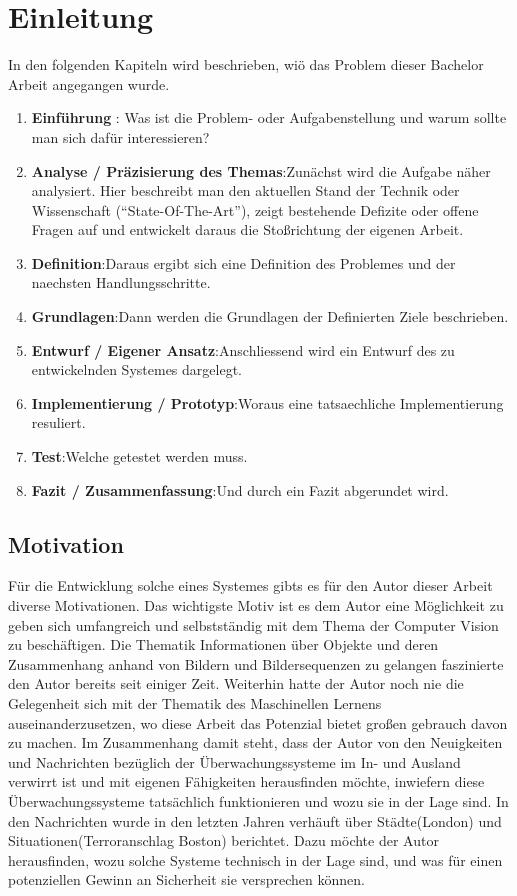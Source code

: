 \chapter{Einleitung}
In den folgenden Kapiteln wird beschrieben, wiö das Problem dieser Bachelor Arbeit angegangen wurde.

\begin{enumerate}
\item \textbf{Einführung }: Was ist die Problem- oder Aufgabenstellung und warum sollte man sich dafür interessieren?
\item \textbf{Analyse / Präzisierung des Themas}:Zunächst wird die Aufgabe näher analysiert. Hier beschreibt man den aktuellen Stand der Technik oder Wissenschaft ("`State-Of-The-Art"'), zeigt bestehende
							Defizite oder offene Fragen auf und entwickelt daraus die Sto\ss{}richtung der eigenen Arbeit.
\item \textbf{Definition}:Daraus ergibt sich eine Definition des Problemes und der naechsten Handlungsschritte.
\item \textbf{Grundlagen}:Dann werden die Grundlagen der Definierten Ziele beschrieben.
\item \textbf{Entwurf / Eigener Ansatz}:Anschliessend wird ein Entwurf des zu entwickelnden Systemes dargelegt.
\item \textbf{Implementierung / Prototyp}:Woraus eine tatsaechliche Implementierung resuliert.
\item \textbf{Test}:Welche getestet werden muss.
\item \textbf{Fazit / Zusammenfassung}:Und durch ein Fazit abgerundet wird.
\end{enumerate}

\section{Motivation}
Für die Entwicklung solche eines Systemes gibts es für den Autor dieser Arbeit diverse Motivationen. Das wichtigste Motiv ist es dem Autor eine Möglichkeit zu geben sich umfangreich und selbstständig mit dem Thema der Computer Vision zu beschäftigen. Die Thematik Informationen über Objekte und deren Zusammenhang anhand von Bildern und Bildersequenzen zu gelangen faszinierte den Autor bereits seit einiger Zeit. Weiterhin hatte der Autor noch nie die Gelegenheit sich mit der Thematik des Maschinellen Lernens auseinanderzusetzen, wo diese Arbeit das Potenzial bietet gro\ss{}en gebrauch davon zu machen.
Im Zusammenhang damit steht, dass der Autor von den Neuigkeiten und Nachrichten bezüglich der \"Uberwachungssysteme im In- und Ausland verwirrt ist und mit eigenen Fähigkeiten herausfinden möchte, inwiefern diese \"Uberwachungssysteme tatsächlich funktionieren und wozu sie in der Lage sind. In den Nachrichten wurde in den letzten Jahren verhäuft über Städte(London) und Situationen(Terroranschlag Boston) berichtet. Dazu möchte der Autor herausfinden, wozu solche Systeme technisch in der Lage sind, und was für einen potenziellen Gewinn an Sicherheit sie versprechen können.

